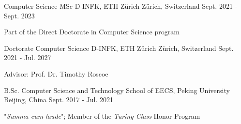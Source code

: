 

\begin{cventries}

  \cventry
    {Computer Science MSc} %
    {D-INFK, ETH Zürich} %
    {Zürich, Switzerland} %
    {Sept. 2021 - Sept. 2023} %
    {
      \begin{cvitems} %
      \item {Part of the Direct Doctorate in Computer Science program}
      \end{cvitems}
    }

  \cventry
    {Doctorate Computer Science} %
    {D-INFK, ETH Zürich} %
    {Zürich, Switzerland} %
    {Sept. 2021 - Jul. 2027} %
    {
      \begin{cvitems} %
      \item {Advisor: Prof. Dr. Timothy Roscoe}
      \end{cvitems}
    }

  \cventry
    {B.Sc. Computer Science and Technology} %
    {School of EECS, Peking University} %
    {Beijing, China} %
    {Sept. 2017 - Jul. 2021} %
    {
      \begin{cvitems} %
      \item {"\emph{Summa cum laude}"; Member of the \emph{Turing Class} Honor Program}
      \end{cvitems}
    }

\end{cventries}
